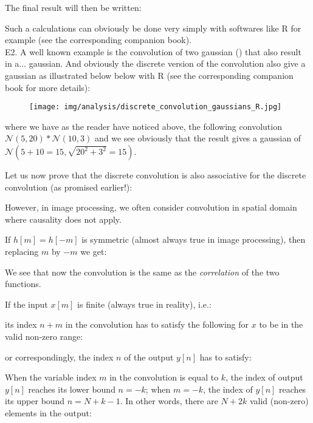 	\begin{tcolorbox}[colframe=black,colback=white,sharp corners]
	
	
	The final result will then be written:
	
	Such a calculations can obviously be done very simply with softwares like R for example (see the corresponding companion book).\\
	
	E2. A well known example is the convolution of two gaussian () that also result in a... gaussian. And obviously the discrete version of the convolution also give a gaussian as illustrated below below with R (see the corresponding companion book for more details):
	\begin{figure}[H]
		\centering
		\texttt{[image: img/analysis/discrete\_convolution\_gaussians\_R.jpg]}
	\end{figure}
	where we have as the reader have noticed above, the following convolution $\mathcal{N}(5,20)*\mathcal{N}(10,3)$ and we see obviously that the result gives a gaussian of $\mathcal{N}(5+10=15,\sqrt{20^2+3^2}=15)$.
	\end{tcolorbox}
	Let us now prove that the discrete convolution is also associative for the discrete convolution (as promised earlier!):
	\begin{dem}
	
	\end{dem}
	However, in image processing, we often consider convolution in spatial domain where causality does not apply.
	
	If $h[m]=h[-m]$ is symmetric (almost always true in image processing),
	then replacing $m$ by $-m$ we get:
	
	We see that now the convolution is the same as the {\em correlation} of the two functions. 
	
	If the input $x[m]$ is finite (always true in reality), i.e.:
	
	its index $n+m$ in the convolution has to satisfy the following for $x$ to be in the valid non-zero range:
		
	or correspondingly, the index $n$ of the output $y[n]$ has to satisfy:
	
	When the variable index $m$ in the convolution is equal to $k$, the 
	index of output $y[n]$ reaches its lower bound $n=-k$; when $m=-k$, 
	the index of $y[n]$ reaches its upper bound $n=N+k-1$. In other words,
	there are $N+2k$ valid (non-zero) elements in the output:
	
